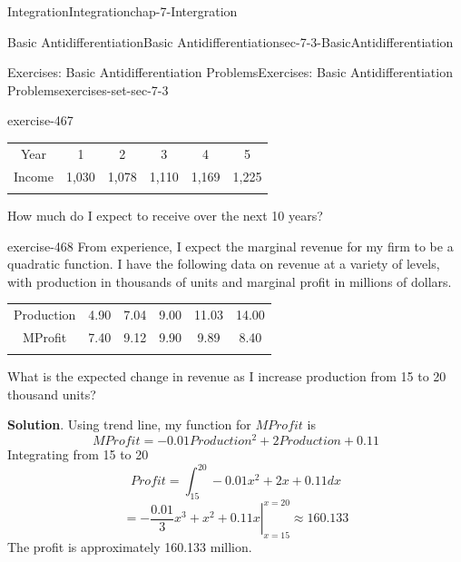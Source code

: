 \documentclass[oneside,10pt,]{book}
\numberwithin{equation}{section}
\newcommand{\hrulethin}  {\noalign{\hrule height 0.04em}}
\newcommand{\hrulemedium}{\noalign{\hrule height 0.07em}}
\newcommand{\hrulethick} {\noalign{\hrule height 0.11em}}
\begin{document}
\begin{chapterptx}{Integration}{}{Integration}{}{}{chap-7-Intergration}
\begin{sectionptx}{Basic Antidifferentiation}{}{Basic Antidifferentiation}{}{}{sec-7-3-BasicAntidifferentiation}
\begin{exercises-subsection-numberless}{Exercises: Basic Antidifferentiation Problems}{}{Exercises: Basic Antidifferentiation Problems}{}{}{exercises-set-sec-7-3}
\begin{divisionexercise}{22}{}{}{exercise-467}
\begin{sidebyside}{1}{0}{0}{0}
\begin{sbspanel}{1}
{\begin{tabular}{cccccc}
Year&1&2&3&4&5\tabularnewline\hrulethin
Income&\textdollar{}1,030&\textdollar{}1,078&\textdollar{}1,110&\textdollar{}1,169&\textdollar{}1,225\tabularnewline\hrulemedium
\end{tabular}
\par}
\end{sbspanel}%
\end{sidebyside}%
\par
\hypertarget{p-2816}{}%
How much do I expect to receive over the next 10 years?%
\end{divisionexercise}%
\begin{divisionexercise}{23}{}{}{exercise-468}%
\hypertarget{p-2817}{}%
From experience, I expect the marginal revenue for my firm to be a quadratic function.  I have the following data on revenue at a variety of levels, with production in thousands of units and marginal profit in millions of dollars.%
\begin{sidebyside}{1}{0}{0}{0}%
\begin{sbspanel}{1}%
{\centering%
\begin{tabular}{cccccc}\hrulethick
Production&\textdollar{}4.90&\textdollar{}7.04&9.00&11.03&14.00\tabularnewline\hrulethin
MProfit&7.40&9.12&9.90&9.89&8.40\tabularnewline\hrulemedium
\end{tabular}
\par}
\end{sbspanel}%
\end{sidebyside}%
\par
\hypertarget{p-2818}{}%
What is the expected change in revenue as I increase production from 15 to 20 thousand units?%
\par\smallskip%
\noindent\textbf{Solution}.\hypertarget{solution-237}{}\quad%
\hypertarget{p-2819}{}%
Using trend line, my function for \(MProfit\) is%
%
\begin{equation*}
MProfit=-0.01Production^2+2Production+0.11
\end{equation*}
\hypertarget{p-2820}{}%
Integrating from 15 to 20%
%
\begin{equation*}
Profit= \int_{15}^{20}-0.01x^2+2x+0.11  dx
\end{equation*}
%
\begin{equation*}
= \left.-\frac{0.01}{3} x^3+x^2+0.11x\right|_{x=15}^{x=20}
\approx 160.133
\end{equation*}
The profit is approximately \textdollar{}160.133 million.\end{divisionexercise}%
\end{exercises-subsection-numberless}

\end{sectionptx}
\end{chapterptx}
\end{document}
